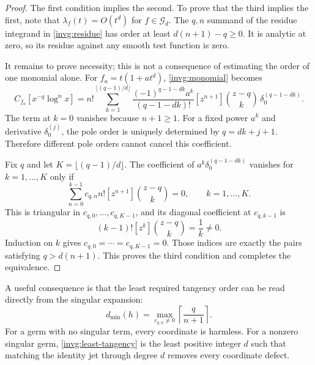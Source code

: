 \begin{proof}
The first condition implies the second.  To prove that the third implies
the first, note that $\lambda_f(t)=O(t^d)$ for $f\in\mathscr G_d$.
The $q,n$ summand of the residue integrand in \eqref{invg:residue} has
order at least $d(n+1)-q\ge0$.  It is analytic at zero, so its residue
against any smooth test function is zero.

It remains to prove necessity; this is not a consequence of estimating
the order of one monomial alone.  For $f_a=t(1+a t^d)$,
\eqref{invg:monomial} becomes
\begin{equation}\label{invg:quadratic-family}
 C_{f_a}[x^{-q}\log^n x]
 =n!\sum_{k=1}^{\lfloor(q-1)/d\rfloor}
 \frac{(-1)^{q-1-dk}a^k}{(q-1-dk)!}
 [z^{n+1}]\binom{z-q}{k}\,\delta_0^{(q-1-dk)}.
\end{equation}
The term at $k=0$ vanishes because $n+1\ge1$.
For a fixed power $a^k$ and derivative $\delta_0^{(j)}$, the pole order
is uniquely determined by $q=dk+j+1$.  Therefore different pole orders
cannot cancel this coefficient.

Fix $q$ and let $K=\lfloor(q-1)/d\rfloor$.  The coefficient of
$a^k\delta_0^{(q-1-dk)}$ vanishes for $k=1,\ldots,K$ only if
\begin{equation}\label{invg:triangular}
 \sum_{n=0}^{k-1}c_{q,n}n![z^{n+1}]\binom{z-q}{k}=0,
 \qquad k=1,\ldots,K.
\end{equation}
This is triangular in $c_{q,0},\ldots,c_{q,K-1}$, and its diagonal
coefficient at $c_{q,k-1}$ is
\[
 (k-1)![z^k]\binom{z-q}{k}=\frac1k\ne0.
\]
Induction on $k$ gives $c_{q,0}=\cdots=c_{q,K-1}=0$.
Those indices are exactly the pairs satisfying $q>d(n+1)$.
This proves the third condition and completes the equivalence.
\end{proof}

A useful consequence is that the least required tangency order can be
read directly from the singular expansion:
\begin{equation}\label{invg:least-tangency}
 d_{\min}(h)=\max_{c_{q,n}\ne0}
              \left\lceil\frac q{n+1}\right\rceil.
\end{equation}
For a germ with no singular term, every coordinate is harmless.  For a
nonzero singular germ, \eqref{invg:least-tangency} is the least positive
integer $d$ such that matching the identity jet through degree $d$
removes every coordinate defect.


